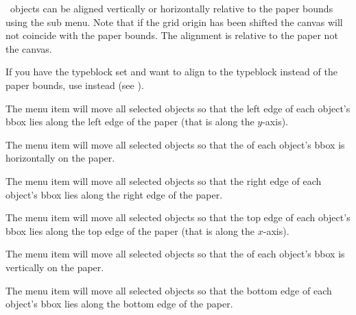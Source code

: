 
\Selected\ \glspl*{object} can be aligned vertically or
horizontally relative to the paper bounds using the
 sub menu.
Note that if the grid \gls{origin} has been shifted the \gls{canvas}
will not coincide with the paper bounds. The alignment is relative
to the paper not the \gls{canvas}.

If you have the \gls{typeblock} set and want to align to the
\gls{typeblock} instead of the paper bounds, use
 instead (see ).


The  menu item will move all
selected objects so that the left edge of each object's \gls{bbox}
lies along the left edge of the paper (that is along the $y$-axis).


The  menu item will move all
selected objects so that the  of each object's \gls{bbox}
is horizontally  on the paper.


The  menu item will move all
selected objects so that the right edge of each object's \gls{bbox}
lies along the right edge of the paper.


The  menu item will move all
selected objects so that the top edge of each object's \gls{bbox}
lies along the top edge of the paper (that is along the $x$-axis).


The  menu item will move all
selected objects so that the  of each object's \gls{bbox}
is vertically  on the paper.


The  menu item will move all
selected objects so that the bottom edge of each object's \gls{bbox}
lies along the bottom edge of the paper.


